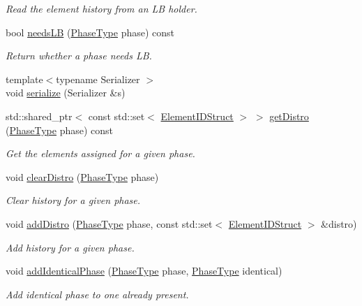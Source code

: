\begin{DoxyCompactItemize}
\begin{DoxyCompactList}\small\item\em Read the element history from an LB holder. \end{DoxyCompactList}\item 
bool \hyperlink{structvt_1_1vrt_1_1collection_1_1balance_1_1_l_b_data_restart_reader_a332e58de26b5d93197d68a4ce3d743fe}{needs\+LB} (\hyperlink{namespacevt_a46ce6733d5cdbd735d561b7b4029f6d7}{Phase\+Type} phase) const
\begin{DoxyCompactList}\small\item\em Return whether a phase needs LB. \end{DoxyCompactList}\item 
{\footnotesize template$<$typename Serializer $>$ }\\void \hyperlink{structvt_1_1vrt_1_1collection_1_1balance_1_1_l_b_data_restart_reader_a26454044882316e639cbfbea61f41c61}{serialize} (Serializer \&s)
\item 
std\+::shared\+\_\+ptr$<$ const std\+::set$<$ \hyperlink{namespacevt_1_1vrt_1_1collection_1_1balance_a9f5b53fafb270212279a4757d2c4cd28}{Element\+I\+D\+Struct} $>$ $>$ \hyperlink{structvt_1_1vrt_1_1collection_1_1balance_1_1_l_b_data_restart_reader_ab266306b5b8e76c709859ebd722b8d10}{get\+Distro} (\hyperlink{namespacevt_a46ce6733d5cdbd735d561b7b4029f6d7}{Phase\+Type} phase) const
\begin{DoxyCompactList}\small\item\em Get the elements assigned for a given phase. \end{DoxyCompactList}\item 
void \hyperlink{structvt_1_1vrt_1_1collection_1_1balance_1_1_l_b_data_restart_reader_afc552e9714573f639444437c0b2d6cc1}{clear\+Distro} (\hyperlink{namespacevt_a46ce6733d5cdbd735d561b7b4029f6d7}{Phase\+Type} phase)
\begin{DoxyCompactList}\small\item\em Clear history for a given phase. \end{DoxyCompactList}\item 
void \hyperlink{structvt_1_1vrt_1_1collection_1_1balance_1_1_l_b_data_restart_reader_abc1544f035265866b6d5ac2dae87d16e}{add\+Distro} (\hyperlink{namespacevt_a46ce6733d5cdbd735d561b7b4029f6d7}{Phase\+Type} phase, const std\+::set$<$ \hyperlink{namespacevt_1_1vrt_1_1collection_1_1balance_a9f5b53fafb270212279a4757d2c4cd28}{Element\+I\+D\+Struct} $>$ \&distro)
\begin{DoxyCompactList}\small\item\em Add history for a given phase. \end{DoxyCompactList}\item 
void \hyperlink{structvt_1_1vrt_1_1collection_1_1balance_1_1_l_b_data_restart_reader_ac336f44c5a00d54506baba46ee606c70}{add\+Identical\+Phase} (\hyperlink{namespacevt_a46ce6733d5cdbd735d561b7b4029f6d7}{Phase\+Type} phase, \hyperlink{namespacevt_a46ce6733d5cdbd735d561b7b4029f6d7}{Phase\+Type} identical)
\begin{DoxyCompactList}\small\item\em Add identical phase to one already present. \end{DoxyCompactList}\end{DoxyCompactItemize}
